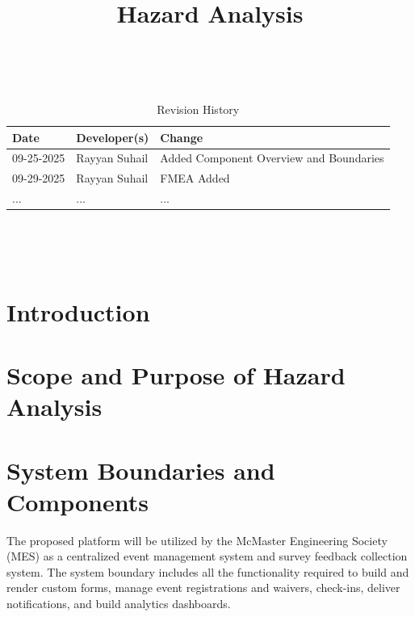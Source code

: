 \documentclass{article}
\title{Hazard Analysis\\\progname}
\author{\authname}
\date{}
\begin{document}
\maketitle
\thispagestyle{empty}

~\newpage


\begin{table}[hp]
\caption{Revision History} \label{TblRevisionHistory}
\begin{tabularx}{\textwidth}{llX}
\toprule
\textbf{Date} & \textbf{Developer(s)} & \textbf{Change}\\
\midrule
09-25-2025 & Rayyan Suhail & Added Component Overview and Boundaries\\
09-29-2025 & Rayyan Suhail & FMEA Added\\
... & ... & ...\\
\bottomrule
\end{tabularx}
\end{table}

~\newpage

\tableofcontents

~\newpage



\section{Introduction}


\section{Scope and Purpose of Hazard Analysis}


\section{System Boundaries and Components}

The proposed platform will be utilized by the McMaster Engineering Society (MES)
as a centralized event management system and survey feedback collection system.
The system boundary includes all the functionality required to build and render
custom forms, manage event registrations and waivers, check-ins, deliver
notifications, and build analytics dashboards.
\end{document}
